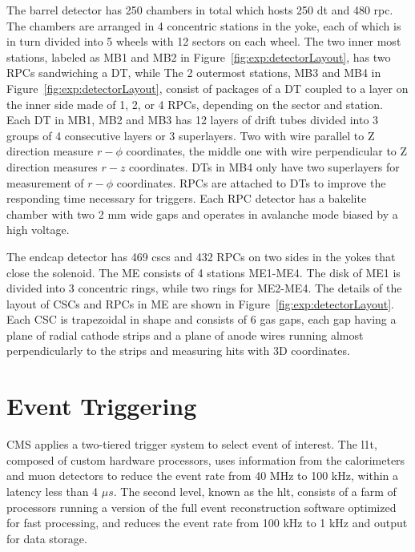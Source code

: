 The barrel detector has 250 chambers in total which hosts 250 \acrfull{dt} and 480 \acrfull{rpc}. The chambers are  arranged in 4 concentric stations in the yoke, each of which is in turn divided into 5 wheels with 12 sectors on each wheel. The two inner most stations, labeled as MB1 and MB2 in Figure~\ref{fig:exp:detectorLayout}, has two RPCs sandwiching a DT, while The 2 outermost stations, MB3 and MB4 in Figure~\ref{fig:exp:detectorLayout}, consist of packages of a DT coupled to a layer on the inner side made of 1, 2, or 4 RPCs, depending on the sector and station.
Each DT in MB1, MB2 and MB3 has 12 layers of drift tubes divided into 3 groups of 4 consecutive layers or 3 superlayers. Two with wire parallel to Z direction measure $r-\phi$ coordinates, the middle one with wire perpendicular to Z direction measures $r-z$ coordinates. DTs in MB4 only have two superlayers for measurement of $r-\phi$ coordinates. RPCs are attached to DTs to improve the responding time necessary for triggers. Each RPC detector has a bakelite chamber with two 2 mm wide gaps and operates in avalanche mode biased by a high voltage. 

The endcap detector has 469 \acrfull{csc}s and 432 RPCs on two sides in the yokes that close the solenoid. The ME consists of 4 stations ME1-ME4. The disk of ME1 is divided into 3 concentric rings, while two rings for ME2-ME4. The details of the layout of CSCs and RPCs in ME are shown in Figure~\ref{fig:exp:detectorLayout}. Each CSC is trapezoidal in shape and consists of 6 gas gaps, each gap having a plane of radial cathode strips and a plane of anode wires running almost perpendicularly to the strips and measuring hits with 3D coordinates.





\section{Event Triggering}
\label{sec:exp:trigger}

CMS applies a two-tiered trigger system \cite{cms:trigger:Khachatryan:2016bia} to select event of interest. The \acrfull{l1t}, composed of custom hardware processors, uses information from the calorimeters and muon detectors to reduce the event rate from 40 MHz to 100 kHz, within a latency less than 4 $\mu s$. The second level, known as the \acrfull{hlt}, consists of a farm of processors running a version of the full event reconstruction software optimized for fast processing, and reduces the event rate from 100 kHz to 1 kHz and output for data storage.



